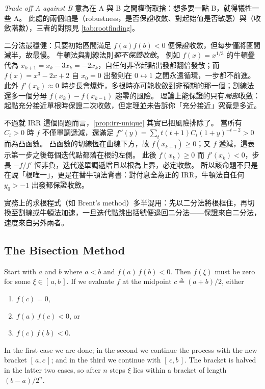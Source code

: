 \begin{remark}
	\emph{Trade off A against B} 意為在 A 與 B 之間權衡取捨：想多要一點 B，就得犧牲一些 A。
	此處的兩個軸是（robustness，是否保證收斂、對起始值是否敏感）與（收斂階數），三者的對照見 \autoref{tab:rootfinding}。

	二分法最穩健：只要初始區間滿足 $f(a)f(b) < 0$ 便保證收斂，但每步僅將區間減半，故最慢。
	牛頓法與割線法則\emph{都不保證收斂}。
	例如 $f(x) = x^{1/3}$ 的牛頓疊代為 $x_{k+1} = x_{k} - 3x_{k} = -2x_{k}$，自任何非零起點出發都翻倍發散；而 $f(x) = x^{3}-2x+2$ 自 $x_{0} = 0$ 出發則在 $0 \leftrightarrow 1$ 之間永遠循環，一步都不前進。
	此外 $f'(x_{k}) \approx 0$ 時步長會爆炸，多根時亦可能收斂到非預期的那一個；割線法還多一個分母 $f(x_{k})-f(x_{k-1})$ 趨零的風險。
	理論上能保證的只有\emph{局部}收斂：起點充分接近單根時保證二次收斂，但定理並未告訴你「充分接近」究竟是多近。

	不過就 IRR 這個問題而言，\autoref{prop:irr-unique} 其實已把風險排除了。
	當所有 $C_{t} > 0$ 時 $f$ 不僅單調遞減，還滿足 $f''(y) = \sum_{t} t(t+1)C_{t}(1+y)^{-t-2} > 0$ 而為凸函數。
	凸函數的切線恆在曲線下方，故 $f(x_{k+1}) \geq 0$；又 $f$ 遞減，這表示第一步之後每個迭代點都落在根的左側。
	此後 $f(x_{k}) \geq 0$ 而 $f'(x_{k}) < 0$，步長 $-f/f'$ 恆非負，迭代遂單調遞增且以根為上界，必定收斂。
	所以該命題不只是在說「根唯一」，更是在替牛頓法背書：對付息全為正的 IRR，牛頓法自任何 $y_{0} > -1$ 出發都保證收斂。

	實務上的求根程式（如 Brent's method）多半混用：先以二分法將根框住，再切換至割線或牛頓法加速，一旦迭代點跳出括號便退回二分法——保證來自二分法，速度來自另外兩者。
\end{remark}
\suppend

\subsection{The Bisection Method}

Start with $a$ and $b$ where $a < b$ and $f(a)\,f(b) < 0$.
Then $f(\xi)$ must be zero for some $\xi \in [\,a,b\,]$.
If we evaluate $f$ at the midpoint $c \triangleq (a+b)/2$, either

\begin{enumerate}[nosep, label=(\arabic*)]
	\item $f(c) = 0$,
	\item $f(a)\,f(c) < 0$, or
	\item $f(c)\,f(b) < 0$.
\end{enumerate}

In the first case we are done; in the second we continue the process with the new bracket $[\,a,c\,]$; and in the third we continue with $[\,c,b\,]$.
The bracket is halved in the latter two cases, so after $n$ steps $\xi$ lies within a bracket of length $(b-a)/2^{n}$.

